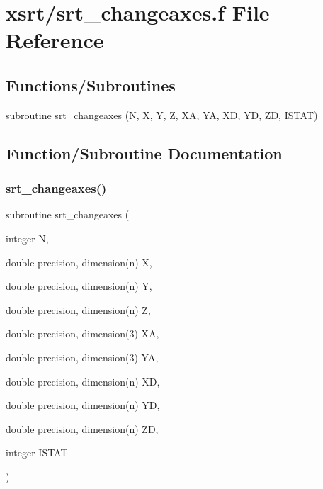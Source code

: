 \hypertarget{srt__changeaxes_8f}{}\section{xsrt/srt\+\_\+changeaxes.f File Reference}
\label{srt__changeaxes_8f}
\subsection*{Functions/\+Subroutines}
\begin{DoxyCompactItemize}
\item 
subroutine \hyperlink{srt__changeaxes_8f_a03374b3e1e00e083ca366e18a2a2bb03}{srt\+\_\+changeaxes} (N, X, Y, Z, XA, YA, XD, YD, ZD, I\+S\+T\+AT)
\end{DoxyCompactItemize}


\subsection{Function/\+Subroutine Documentation}
\mbox{\label{srt__changeaxes_8f_a03374b3e1e00e083ca366e18a2a2bb03}} 
\subsubsection{\texorpdfstring{srt\+\_\+changeaxes()}{srt\_changeaxes()}}
{\footnotesize\ttfamily subroutine srt\+\_\+changeaxes (\begin{DoxyParamCaption}\item[{integer}]{N,  }\item[{double precision, dimension(n)}]{X,  }\item[{double precision, dimension(n)}]{Y,  }\item[{double precision, dimension(n)}]{Z,  }\item[{double precision, dimension(3)}]{XA,  }\item[{double precision, dimension(3)}]{YA,  }\item[{double precision, dimension(n)}]{XD,  }\item[{double precision, dimension(n)}]{YD,  }\item[{double precision, dimension(n)}]{ZD,  }\item[{integer}]{I\+S\+T\+AT }\end{DoxyParamCaption})}

